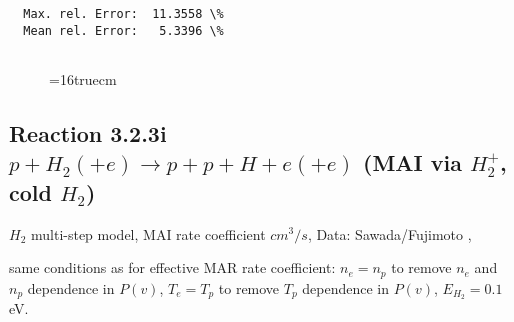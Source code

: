 \documentclass[12pt,dvipdfmx]{article}
\begin{document}
\begin{small}
\begin{verbatim}
  Max. rel. Error:  11.3558 \%
  Mean rel. Error:   5.3396 \%


\end{verbatim}\end{small}
\begin{figure} \label{2.2.5mad}
\epsfxsize=16truecm
\end{figure}
\newpage

\subsection{
Reaction 3.2.3i   $p + H_2 (+e)  \rightarrow p + p + H +e (+e) $ (MAI via $H_2^+$, cold $H_2$)
}

$H_2$ multi-step model, MAI rate coefficient $cm^3/s$,
 Data: Sawada/Fujimoto ,\cite{kn:Sawada}

same conditions as for effective MAR rate coefficient: $n_e=n_p$ to remove $n_e$ and $n_p$ dependence in $P(v)$,
$T_e=T_p$ to remove $T_p$ dependence in $P(v)$,  $E_{H_2}=0.1$ eV.
\end{document}
